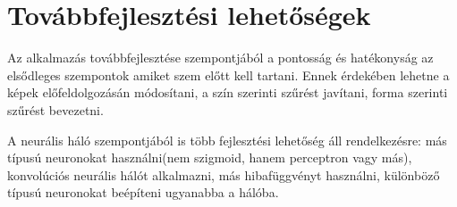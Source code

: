 \chapter{Továbbfejlesztési lehetőségek}\label{ch:tovabb}

Az alkalmazás továbbfejlesztése szempontjából a pontosság és hatékonyság az elsődleges szempontok amiket szem előtt kell tartani. Ennek érdekében lehetne a képek előfeldolgozásán módosítani, a szín szerinti szűrést javítani, forma szerinti szűrést bevezetni. 

A neurális háló szempontjából is több fejlesztési lehetőség áll rendelkezésre: más típusú neuronokat használni(nem szigmoid, hanem perceptron vagy más), konvolúciós neurális hálót alkalmazni, más hibafüggvényt használni, különböző típusú neuronokat beépíteni ugyanabba a hálóba.
